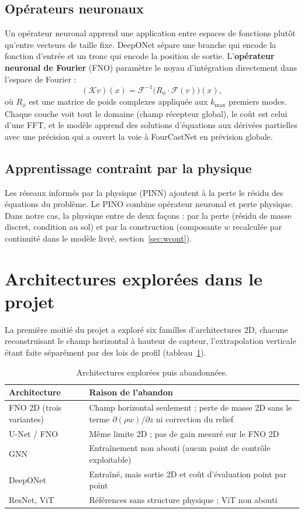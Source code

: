 \subsection{Opérateurs neuronaux}
Un opérateur neuronal apprend une application entre espaces de fonctions plutôt qu'entre vecteurs
de taille fixe. DeepONet \citep{lu2021} sépare une branche qui encode la fonction d'entrée et un
tronc qui encode la position de sortie. L'\textbf{opérateur neuronal de Fourier} (FNO)
\citep{li2021fno} paramètre le noyau d'intégration directement dans l'espace de Fourier :
\begin{equation}
  (\mathcal{K}v)(x) = \mathcal{F}^{-1}\!\big(R_\phi \cdot \mathcal{F}(v)\big)(x),
\end{equation}
où $R_\phi$ est une matrice de poids complexes appliquée aux $k_{\max}$ premiers modes. Chaque
couche voit tout le domaine (champ récepteur global), le coût est celui d'une FFT, et le modèle
apprend des solutions d'équations aux dérivées partielles avec une précision qui a ouvert la voie à
FourCastNet \citep{pathak2022} en prévision globale.

\subsection{Apprentissage contraint par la physique}
Les réseaux informés par la physique (PINN) \citep{raissi2019} ajoutent à la perte le résidu des
équations du problème. Le PINO \citep{li2024pino} combine opérateur neuronal et perte physique.
Dans notre cas, la physique entre de deux façons : par la perte (résidu de masse discret,
condition au sol) et par la construction (composante $w$ recalculée par continuité dans le modèle
livré, section~\ref{sec:wcont}).

\section{Architectures explorées dans le projet}
La première moitié du projet a exploré six familles d'architectures 2D, chacune reconstruisant le
champ horizontal à hauteur de capteur, l'extrapolation verticale étant faite séparément par des
lois de profil (tableau~\ref{tab:archi}).

\begin{table}[H]
\centering
\caption{Architectures explorées puis abandonnées.}
\label{tab:archi}
\begin{tabularx}{\linewidth}{@{}lX@{}}
\toprule
Architecture & Raison de l'abandon\\
\midrule
FNO 2D (trois variantes) & Champ horizontal seulement ; perte de masse 2D sans le terme $\partial(\rho w)/\partial z$ ni correction du relief\\
U-Net / FNO & Même limite 2D ; pas de gain mesuré sur le FNO 2D\\
GNN & Entraînement non abouti (aucun point de contrôle exploitable)\\
DeepONet & Entraîné, mais sortie 2D et coût d'évaluation point par point\\
ResNet, ViT & Références sans structure physique ; ViT non abouti\\
\bottomrule
\end{tabularx}
\end{table}


